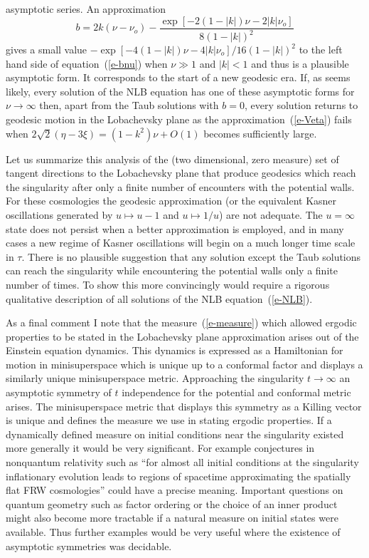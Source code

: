 asymptotic series.  An approximation
\begin{equation}
   b =  2 k (\nu - \nu_o)
        - \frac{\exp[-2(1-|k|)\nu-2|k|\nu_o]}{8 (1-|k|)^2}
\end{equation}
gives a small value $-\exp[-4(1-|k|)\nu-4|k|\nu_o]/16(1-|k|)^2$ to
the left hand side of equation~(\ref{e-bnu}) when $\nu \gg 1$ and
$|k|<1$ and thus is a plausible asymptotic form. It corresponds to
the start of a new geodesic era.  If, as seems likely, every solution
of the NLB equation has one of these asymptotic forms for $\nu
\rightarrow \infty$ then, apart from the Taub solutions with $b=0$,
every solution returns to geodesic motion in the Lobachevsky plane as
the approximation~(\ref{e-Veta}) fails when $2\sqrt{2}(\eta - 3\xi)
=(1-k^2)\nu + O(1)$ becomes sufficiently large.

Let us summarize this analysis of the (two dimensional, zero measure)
set of tangent directions to the Lobachevsky plane that produce
geodesics which reach the singularity after only a finite number of
encounters with the potential walls.  For these cosmologies the
geodesic approximation (or the equivalent Kasner oscillations
generated by $u \mapsto u-1$ and $u \mapsto 1/u$) are not adequate.
The $u=\infty$ state does not persist when a better approximation is
employed, and in many cases a new regime of Kasner oscillations will
begin on a much longer time scale in $\tau$.  There is no plausible
suggestion that any solution except the Taub solutions can reach the
singularity while encountering the potential walls only a finite
number of times.  To show this more convincingly would require a
rigorous qualitative description of all solutions of the NLB
equation~(\ref{e-NLB}).

As a final comment I note that the measure~(\ref{e-measure}) which
allowed ergodic properties to be stated in the Lobachevsky plane
approximation arises out of the Einstein equation dynamics.  This
dynamics is expressed as a Hamiltonian for motion in minisuperspace
which is unique up to a conformal factor and displays a similarly
unique minisuperspace metric.  Approaching the singularity $t
\rightarrow \infty$ an asymptotic symmetry of $t$ independence for
the potential and conformal metric arises.  The minisuperspace metric
that displays this symmetry as a Killing vector is unique and defines
the measure we use in stating ergodic properties.  If a dynamically
defined measure on initial conditions near the singularity existed
more generally it would be very significant.  For example conjectures
in nonquantum relativity such as ``for almost all initial conditions
at the singularity inflationary evolution leads to regions of
spacetime approximating the spatially flat FRW cosmologies'' could
have a precise meaning.  Important questions on quantum geometry such
as factor ordering or the choice of an inner product might also
become more tractable if a natural measure on initial states were
available.  Thus further examples would be very useful where the
existence of asymptotic symmetries was decidable.


